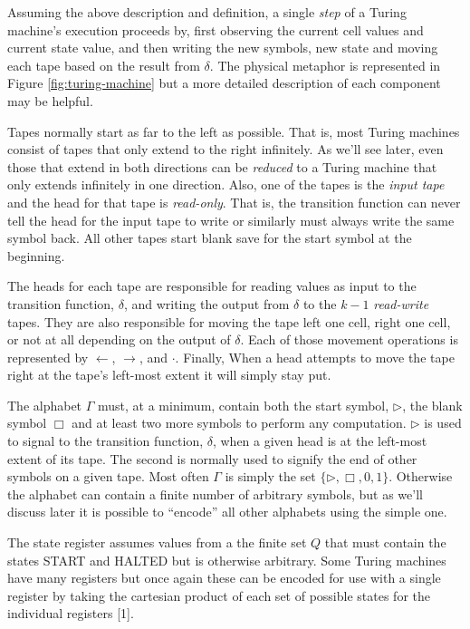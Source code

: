 \documentclass[usletter]{article}
\begin{document}
Assuming the above description and definition, a single \textit{step} of a Turing machine's execution proceeds by, first observing the current cell values and current state value, and then writing the new symbols, new state and moving each tape based on the result from $\delta$. The physical metaphor is represented in Figure \ref{fig:turing-machine} but a more detailed description of each component may be helpful.

Tapes normally start as far to the left as possible. That is, most Turing machines consist of tapes that only extend to the right infinitely. As we'll see later, even those that extend in both directions can be \textit{reduced} to a Turing machine that only extends infinitely in one direction. Also, one of the tapes is the \textit{input tape} and the head for that tape is \textit{read-only}. That is, the transition function can never tell the head for the input tape to write or similarly must always write the same symbol back. All other tapes start blank save for the start symbol at the beginning.

The heads for each tape are responsible for reading values as input to the transition function, $\delta$, and writing the output from $\delta$ to the $k-1$ \textit{read-write} tapes. They are also responsible for moving the tape left one cell, right one cell, or not at all depending on the output of $\delta$. Each of those movement operations is represented by $\leftarrow$, $\rightarrow$, and $\cdot$. Finally, When a head attempts to move the tape right at the tape's left-most extent it will simply stay put.

The alphabet $\Gamma$ must, at a minimum, contain both the start symbol, $\rhd$, the blank symbol $\Box$ and at least two more symbols to perform any computation. $\rhd$ is used to signal to the transition function, $\delta$, when a given head is at the left-most extent of its tape. The second is normally used to signify the end of other symbols on a given tape. Most often $\Gamma$ is simply the set $\{\rhd, \Box, 0, 1\}$. Otherwise the alphabet can contain a finite number of arbitrary symbols, but as we'll discuss later it is possible to ``encode'' all other alphabets using the simple one.

The state register assumes values from a the finite set $Q$ that must contain the states \textsf{START} and \textsf{HALTED} but is otherwise arbitrary. Some Turing machines have many registers but once again these can be encoded for use with a single register by taking the cartesian product of each set of possible states for the individual registers [1].
\end{document}
